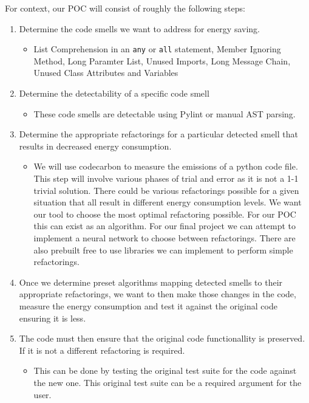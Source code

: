 \documentclass{article}
\begin{document}
For context, our POC will consist of roughly the following steps:
\begin{enumerate}
  \item Determine the code smells we want to address for energy saving.
    \begin{itemize}
      \item List Comprehension in an \texttt{any} or \texttt{all}
        statement, Member Ignoring Method, Long Paramter List, Unused
        Imports, Long Message Chain, Unused Class Attributes and Variables
    \end{itemize}
  \item Determine the detectability of a specific code smell
    \begin{itemize}
      \item These code smells are detectable using Pylint or manual AST parsing.
    \end{itemize}
  \item Determine the appropriate refactorings for a particular
    detected smell that results in decreased energy consumption.
    \begin{itemize}
      \item We will use codecarbon to measure the emissions of a
        python code file. This step will involve various phases of
        trial and error as it is not a 1-1 trivial solution. There
        could be various refactorings possible for a given situation
        that all result in different energy consumption levels. We
        want our tool to choose the most optimal refactoring
        possible. For our POC this can exist as an algorithm. For our
        final project we can attempt to implement a neural network to
        choose between refactorings. There are also prebuilt free to
        use libraries we can implement to perform simple refactorings.
    \end{itemize}
  \item Once we determine preset algorithms mapping detected smells
    to their appropriate refactorings, we want to then make those
    changes in the code, measure the energy consumption and test it
    against the original code ensuring it is less.
  \item The code must then ensure that the original code
    functionallity is preserved. If it is not a different refactoring
    is required.
    \begin{itemize}
      \item This can be done by testing the original test suite for
        the code against the new one. This original test suite can be
        a required argument for the user.
    \end{itemize}
\end{enumerate}
\end{document}
